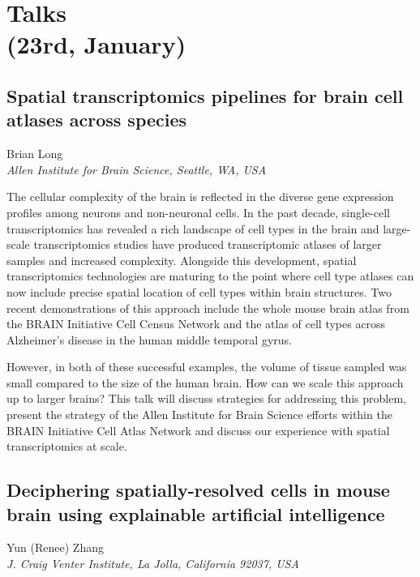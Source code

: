 \chapter[Talks (23rd, January)]{Talks\\(23rd, January)}

\section*{Spatial transcriptomics pipelines for brain cell atlases across species}

\begin{center}
Brian Long \\
\vspace{0.2cm}
\textit{Allen Institute for Brain Science, Seattle, WA, USA} \\
\end{center}

\noindent
The cellular complexity of the brain is reflected in the diverse gene expression profiles among neurons and non-neuronal cells. In the past decade, single-cell transcriptomics has revealed a rich landscape of cell types in the brain and large-scale transcriptomics studies have produced transcriptomic atlases of larger samples and increased complexity. Alongside this development, spatial transcriptomics technologies are maturing to the point where cell type atlases can now include precise spatial location of cell types within brain structures. Two recent demonstrations of this approach include the whole mouse brain atlas from the BRAIN Initiative Cell Census Network and the atlas of cell types across Alzheimer's disease in the human middle temporal gyrus. 

However, in both of these successful examples, the volume of tissue sampled was small compared to the size of the human brain. How can we scale this approach up to larger brains? This talk will discuss strategies for addressing this problem, present the strategy of the Allen Institute for Brain Science efforts within the BRAIN Initiative Cell Atlas Network and discuss our experience with spatial transcriptomics at scale.
\newpage

\section*{Deciphering spatially-resolved cells in mouse brain using explainable artificial intelligence}

\begin{center}
Yun (Renee) Zhang \\
\vspace{0.2cm}
\textit{J. Craig Venter Institute, La Jolla, California 92037, USA}
\end{center}

